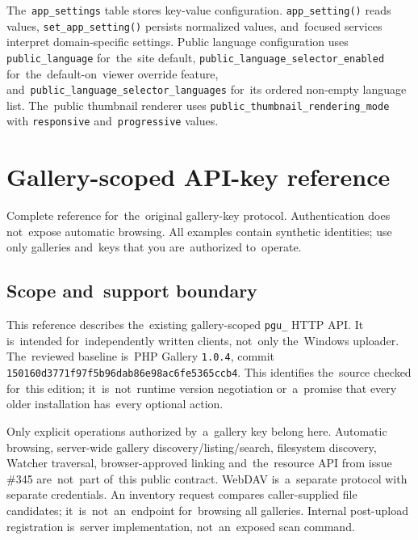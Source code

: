 \documentclass[11pt,a4paper]{article}
\newcommand{\setting}[1]{\nolinkurl{#1}}
\newcommand{\codeword}[1]{\nolinkurl{#1}}
\begin{document}
The~\codeword{app_settings} table stores key-value configuration.
\codeword{app_setting()} reads values, \codeword{set_app_setting()} persists
normalized values, and~focused services interpret domain-specific settings.
Public language configuration uses \setting{public_language} for~the~site
default, \setting{public_language_selector_enabled} for~the~default-on~viewer
override feature, and~\setting{public_language_selector_languages} for~its
ordered non-empty language list. The~public thumbnail renderer uses
\setting{public_thumbnail_rendering_mode} with \setting{responsive}
and~\setting{progressive} values.



\section{Gallery-scoped API-key reference}

\label{sec:gallery-key-api}


Complete reference for~the~original gallery-key protocol. Authentication does not~expose
automatic browsing. All examples contain synthetic identities; use only galleries and~keys
that you are~authorized to~operate.

\subsection{\texorpdfstring{Scope and~support boundary}{Scope and support boundary}}

\label{api352:scope}

This reference describes the~existing gallery-scoped \codeword{pgu_} HTTP API. It
is~intended for~independently written clients, not~only the~Windows uploader. The~reviewed
baseline is~PHP Gallery \codeword{1.0.4}, commit
\codeword{150160d3771f97f5b96dab86e98ac6fe5365ccb4}. This identifies the~source checked
for~this edition; it~is~not~runtime version negotiation or~a~promise that every older
installation has~every optional action.

Only explicit operations authorized by~a~gallery key belong here. Automatic browsing,
server-wide gallery discovery/listing/search, filesystem discovery, Watcher traversal,
browser-approved linking and~the~resource API from issue \#345 are~not~part of~this public
contract. WebDAV is~a~separate protocol with separate credentials. An inventory request
compares caller-supplied file candidates; it~is~not~an~endpoint for~browsing all galleries.
Internal post-upload registration is~server implementation, not~an~exposed scan command.
\end{document}

